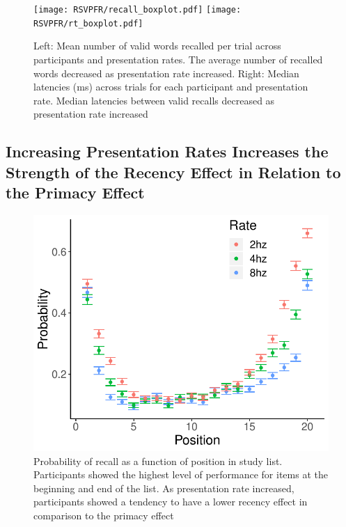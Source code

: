 \documentclass[10pt,letterpaper]{article}
\begin{document}
\begin{figure}[H]
\begin{center}
\texttt{[image: RSVPFR/recall\_boxplot.pdf]}
\texttt{[image: RSVPFR/rt\_boxplot.pdf]}
\end{center}
\caption{Left: Mean number of valid words recalled per trial across participants and presentation rates. The average number of recalled words decreased as presentation rate increased. Right: Median latencies (ms) across trials for each participant and presentation rate. Median latencies between valid recalls decreased as presentation rate increased} 
\label{Descriptives}
\end{figure}

\subsection{Increasing Presentation Rates Increases the Strength of the Recency Effect in Relation to the Primacy Effect}

\begin{figure}[H]
\begin{center}
\includegraphics[width = .4\textwidth]{SPC_adjusted.pdf}
\end{center}
\caption{Probability of recall as a function of position in study list. Participants showed the highest level of performance for items at the beginning and end of the list. As presentation rate increased, participants showed a tendency to have a lower recency effect in comparison to the primacy effect} 
\label{SPC}
\end{figure}
\end{document}
